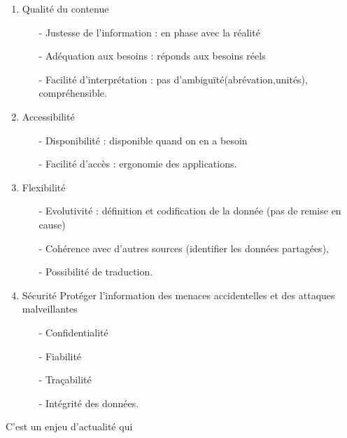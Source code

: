\begin{enumerate}
\item {Qualité du contenue}
\begin{itemize}
\item[-]Justesse de l’information : en phase avec la réalité
\item[-]Adéquation aux besoins : réponds aux besoins réels
\item[-]Facilité d'interprétation : pas d'ambiguïté(abrévation,unités), compréhensible.
\end{itemize}
\item {Accessibilité}
\begin{itemize}
\item[-]Disponibilité : disponible quand on en a besoin
\item[-]Facilité d’accès : ergonomie des applications.
\end{itemize}
\item {Flexibilité}
\begin{itemize}
\item[-]Evolutivité : définition et codification de la donnée (pas de remise en cause) 
\item[-]Cohérence avec d’autres sources (identifier les données partagées), 
\item[-]Possibilité de traduction.
\end{itemize}
\item {Sécurité}
Protéger l’information des menaces accidentelles et des attaques malveillantes
\begin{itemize}
\item[-]Confidentialité 
\item[-]Fiabilité 
\item[-]Traçabilité
\item[-]Intégrité des données.
\end{itemize}
\end{enumerate}
C'est un enjeu d'actualité qui 
